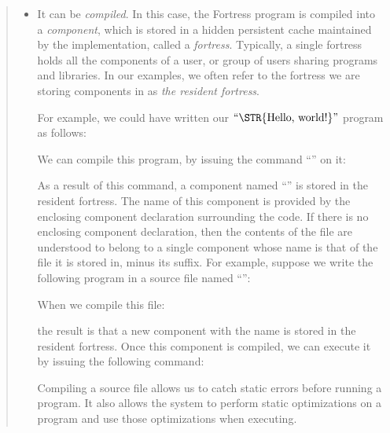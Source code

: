 \begin{description}
\begin{quote}
\begin{itemize}
We can execute this program by issuing the following command to the shell:


The instruction  can be abbreviated as :


\item It can be \emph{compiled}. In this case, the Fortress program is
compiled into a
\emph{component}, which is stored in a hidden persistent cache maintained by the implementation,
called a \emph{fortress}. Typically, a single fortress holds all the components
of a user, or group of users sharing programs and libraries.
In our examples,
we often refer to the fortress we are storing components in
as \emph{the resident fortress}.

For example, we could have written our \(\hbox{\rm``\STR{Hello,~world!}''}\)
program as follows:


We can compile this program, by issuing the command
``'' on it:


As a result of this command, a component named ``'' is stored
in the resident fortress. The name of this component is provided by
the enclosing component declaration surrounding the code. If there is
no enclosing component declaration, then the contents of the file are
understood to belong to a single component whose name is that of the
file it is stored in, minus its suffix. For example, suppose we write the
following program in a source file named ``'':


When we compile this file:


the result is that a new component with the name  is stored
in the resident fortress.
Once this component is compiled,
we can execute it by issuing
the following command:


Compiling a source file allows us to catch static errors before running a program.
It also allows the system to perform static optimizations on a program and use those
optimizations when executing.


\end{itemize}
\end{quote}
\end{description}
